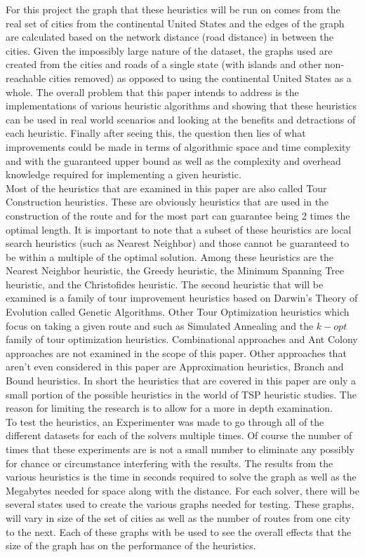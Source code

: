 \documentclass[midd]{thesis}
\newcommand{\tab}{\hspace*{2em}}
\begin{document}
\tab For this project the graph that these heuristics will be run on comes from the real set of cities from the continental United States and the edges of the graph are calculated based on the network distance (road distance) in between the cities. Given the impossibly large nature of the dataset, the graphs used are created from the cities and roads of a single state (with islands and other non-reachable cities removed) as opposed to using the continental United States as a whole. The overall problem that this paper intends to address is the implementations of various heuristic algorithms and showing that these heuristics can be used in real world scenarios and looking at the benefits and detractions of each heuristic. Finally after seeing this, the question then lies of what improvements could be made in terms of algorithmic space and time complexity and with the guaranteed upper bound as well as the complexity and overhead knowledge required for implementing a given heuristic.\\
\tab Most of the heuristics that are examined in this paper are also called Tour Construction heuristics. These are obviously heuristics that are used in the construction of the route and for the most part can guarantee being 2 times the optimal length. It is important to note that a subset of these heuristics are local search heuristics (such as Nearest Neighbor) and those cannot be guaranteed to be within a multiple of the optimal solution\cite{ttps}. Among these heuristics are the Nearest Neighbor heuristic, the Greedy heuristic, the Minimum Spanning Tree  heuristic, and the Christofides heuristic. The second heuristic that will be examined is a family of tour improvement heuristics based on Darwin's Theory of Evolution called Genetic Algorithms. Other Tour Optimization heuristics which focus on taking a given route and such as Simulated Annealing and the $k-opt$ family of tour optimization heuristics. Combinational approaches and Ant Colony approaches are not examined in the scope of this paper. Other approaches that aren't even considered in this paper are Approximation heuristics, Branch and Bound heuristics. In short the heuristics that are covered in this paper are only a small portion of the possible heuristics in the world of TSP heuristic studies. The reason for limiting the research is to allow for a more in depth examination.\\
\tab To test the heuristics, an Experimenter was made to go through all of the different datasets for each of the solvers multiple times. Of course the number of times that these experiments are is not a small number to eliminate any possibly for chance or circumstance interfering with the results. The results from the various heuristics is  the time in seconds required to solve the graph as well as the Megabytes needed for space along with the distance. For each solver, there will be several states used to create the various graphs needed for testing. These graphs, will vary in size of the set of cities as well as the number of routes from one city to the next. Each of these graphs with be used to see the overall effects that the size of the graph has on the performance of the heuristics.\\
\end{document}
